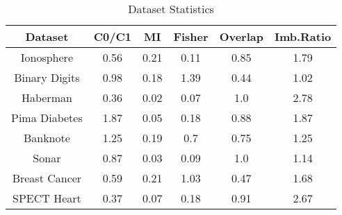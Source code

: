 \begin{table}[htbp]
\caption{Dataset Statistics}
\begin{center}
\begin{tabular}{|c|c|c|c|c|c|}
\hline
\textbf{Dataset} & \textbf{C0/C1} & \textbf{MI} & \textbf{Fisher} & \textbf{Overlap} & \textbf{Imb.Ratio} \\ \hline
Ionosphere & 0.56 & 0.21 & 0.11 & 0.85 & 1.79 \\ \hline
Binary Digits & 0.98 & 0.18 & 1.39 & 0.44 & 1.02 \\ \hline
Haberman & 0.36 & 0.02 & 0.07 & 1.0 & 2.78 \\ \hline
Pima Diabetes & 1.87 & 0.05 & 0.18 & 0.88 & 1.87 \\ \hline
Banknote & 1.25 & 0.19 & 0.7 & 0.75 & 1.25 \\ \hline
Sonar & 0.87 & 0.03 & 0.09 & 1.0 & 1.14 \\ \hline
Breast Cancer & 0.59 & 0.21 & 1.03 & 0.47 & 1.68 \\ \hline
SPECT Heart & 0.37 & 0.07 & 0.18 & 0.91 & 2.67 \\ \hline
\end{tabular}
\label{tab:statistics}
\end{center}
\end{table}